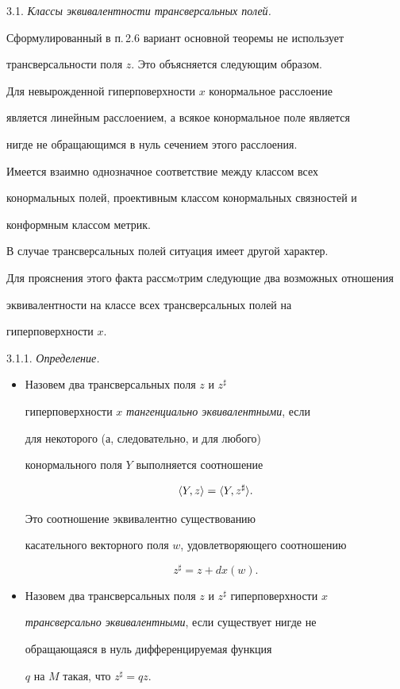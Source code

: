 3.1. {\it Классы эквивалентности трансверсальных полей.}


Сформулированный в п.\,2.6 вариант основной теоремы не использует


трансверсальности поля $z$. Это объясняется следующим образом.


Для невырожденной гиперповерхности $x$ конормальное расслоение


является линейным расслоением, а всякое конормальное поле является


нигде не обращающимся в нуль сечением этого расслоения.


Имеется взаимно однозначное соответствие между классом всех


конормальных полей, проективным классом конормальных связностей и


конформным классом метрик.


В случае трансверсальных полей ситуация имеет другой характер.


Для прояснения этого факта рассмoтрим следующие два возможных отношения


эквивалентности на классе всех трансверсальных полей на


гиперповерхности $x$.


\medskip





3.1.1. {\it Определение.}


\begin{itemize}


\item[(i)]


Назовем два трансверсальных поля $z$ и $z^\sharp$


гиперповерхности $x$ {\it тангенциально эквивалентными}, если


для некоторого (а, следовательно, и для любого)


конормального поля $Y$ выполняется соотношение


$$


\la Y,z\ra=\la Y,z^{\sharp}\ra.


$$


Это соотношение эквивалентно существованию


касательного векторного поля $w$, удовлетворяющего соотношению


$$


z^{\sharp} = z + dx(w).


$$


\item[(ii)]


Назовем два трансверсальных поля $z$ и $z^\sharp$ гиперповерхности $x$


{\it трансверсально эквивалентными}, если существует нигде не


обращающаяся в нуль дифференцируемая функция


$q$ на $M$ такая, что $z^\sharp = qz$.


\end{itemize}





